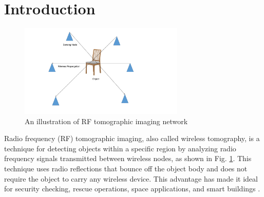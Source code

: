 \documentclass[futureinternet,article,submit,moreauthors,pdftex,10pt,a4paper]{Definitions/mdpi}
\theoremstyle{plain}
\theoremstyle{definition}
\theoremstyle{remark}
\begin{document}


\section{Introduction}
\begin{figure}[H]
\centering
\includegraphics[width=0.7\textwidth]{RF.pdf}
\caption{An illustration of RF tomographic imaging network}
\label{Fig:RF}
\end{figure}
Radio frequency (RF) tomographic imaging, also called wireless tomography, is a technique for detecting objects within a specific region by analyzing radio frequency signals transmitted between wireless nodes, as shown in Fig. \ref{Fig:RF}. This technique uses radio reflections that bounce off the object body and does not require the object to carry any wireless device. This advantage has made it ideal for security checking, rescue operations, space applications, and smart buildings \cite{matsuda2017multi}.
\end{document}
